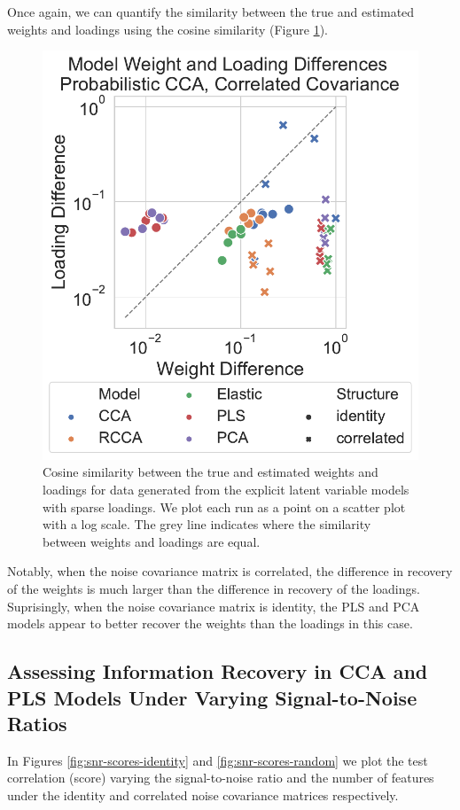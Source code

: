 Once again, we can quantify the similarity between the true and estimated weights and \gls{loadings} using the cosine similarity (Figure \ref{fig:explicit-weights-loadings-cosine}).

\begin{figure}
\centering
\includegraphics[width=0.8\linewidth]{figures/simulated/explicit/weight_loading_difference}
\caption{Cosine similarity between the true and estimated weights and \gls{loadings} for data generated from the explicit latent variable models with sparse \gls{loadings}. We plot each run as a point on a scatter plot with a log scale. The grey line indicates where the similarity between weights and loadings are equal.}\label{fig:explicit-weights-loadings-cosine}
\end{figure}

Notably, when the noise covariance matrix is correlated, the difference in recovery of the weights is much larger than the difference in recovery of the \gls{loadings}.
Suprisingly, when the noise covariance matrix is identity, the PLS and PCA models appear to better recover the weights than the loadings in this case.

\subsection{Assessing Information Recovery in CCA and PLS Models Under Varying Signal-to-Noise Ratios}

In Figures \ref{fig:snr-scores-identity} and \ref{fig:snr-scores-random} we plot the test correlation (score) varying the signal-to-noise ratio and the number of features under the identity and correlated noise covariance matrices respectively.

